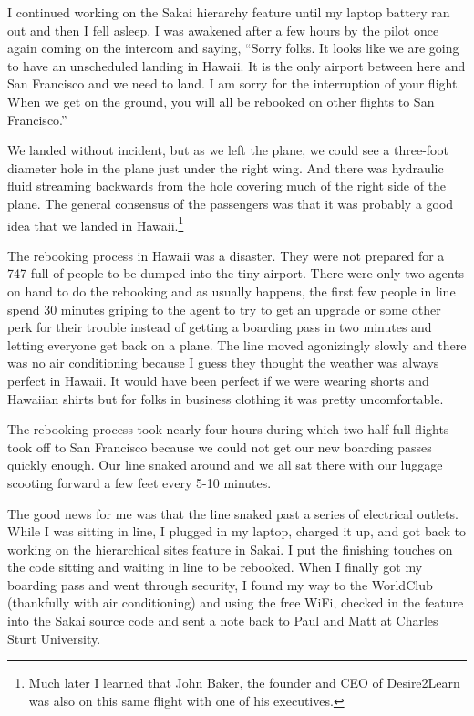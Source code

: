 \documentclass[12pt]{book}
\begin{document}
I continued working on the Sakai hierarchy feature until my laptop battery ran out
and then I fell asleep.   I was awakened after a few hours by the pilot
once again coming on the intercom and saying, ``Sorry folks.  It looks like
we are going to have an unscheduled landing in Hawaii.  It is the only airport
between here and San Francisco and we need to land.  I am sorry for the
interruption of your flight.   When we get on the ground, you will all be rebooked
on other flights to San Francisco.''

We landed without incident, but as we left the plane, we could see a three-foot
diameter hole in the plane just under the right wing.   And there was hydraulic fluid
streaming backwards from the hole covering much of the right side of the plane.
The general consensus of the passengers was that it was probably a good idea that
we landed in Hawaii.\footnote{Much later I learned that John Baker, the founder and CEO
of Desire2Learn was also on this same flight with one of his executives.}

The rebooking process in Hawaii was a disaster.  They were not prepared for a 747 full
of people to be dumped into the tiny airport.   There were only two agents on hand to do the
rebooking and as usually happens, the first few people in line spend 30 minutes griping
to the agent to try to get an upgrade or some other perk for their trouble instead of
getting a boarding pass in two minutes and letting everyone get back on a plane.  The line
moved agonizingly slowly and there was no air conditioning because I guess they thought
the weather was always perfect in Hawaii.   It would have been perfect if we were
wearing shorts and Hawaiian shirts but for folks in business clothing it was
pretty uncomfortable.

The rebooking process took nearly four hours during which two half-full flights
took off to San Francisco because we could not get our new boarding passes quickly enough.
Our line snaked around and we all sat there with our luggage scooting forward a few feet
every 5-10 minutes.

The good news for me was that the line snaked past a series of electrical outlets.
While I was sitting in line, I plugged in my laptop, charged it up, and got back to working on
the hierarchical sites feature in Sakai.   I put the finishing
touches on the code sitting and waiting in line to be rebooked.  When I finally
got my boarding pass and went through security, I found my way to the WorldClub (thankfully
with air conditioning) and using the free WiFi, checked in the feature into the Sakai source
code and sent a note back to Paul and Matt at Charles Sturt University.
\end{document}
